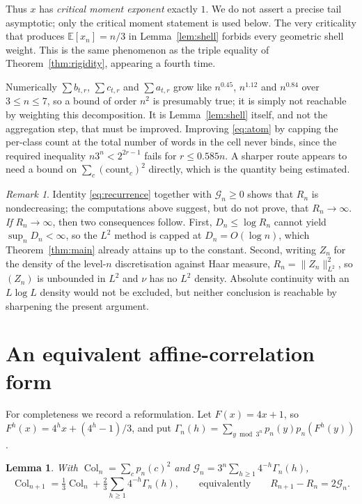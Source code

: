 \documentclass[11pt,reqno]{amsart}
\theoremstyle{plain}
\newtheorem{lemma}[theorem]{Lemma}
\theoremstyle{definition}
\theoremstyle{remark}
\newtheorem{remark}[theorem]{Remark}
\newcommand{\Col}{\operatorname{Col}}
\newcommand{\E}{\mathbb{E}}
\begin{document}
Thus $x$ has \emph{critical moment exponent} exactly $1$. We do not assert
a precise tail asymptotic; only the critical moment statement is used
below. The very criticality that produces $\E[x_n]=n/3$ in
Lemma~\ref{lem:shell} forbids every geometric shell weight. This is the
same phenomenon as the triple equality of Theorem~\ref{thm:rigidity},
appearing a fourth time.

Numerically $\sum b_{t,r}$, $\sum c_{t,r}$ and $\sum a_{t,r}$ grow like
$n^{0.45}$, $n^{1.12}$ and $n^{0.84}$ over $3\le n\le7$, so a bound of
order $n^{2}$ is presumably true; it is simply not reachable by weighting
this decomposition. It is Lemma~\ref{lem:shell} itself, and not the
aggregation step, that must be improved. Improving
\eqref{eq:atom} by capping the per-class count at the total number of words
in the cell never binds, since the required inequality $n3^n<2^{2r-1}$ fails
for $r\le0.585n$. A sharper route appears to need a bound on
$\sum_c(\text{count}_c)^2$ directly, which is the quantity being estimated.

\begin{remark}\label{rem:cap}
Identity \eqref{eq:recurrence} together with $\mathcal G_n\ge0$ shows that
$R_n$ is nondecreasing; the computations above suggest, but do not prove,
that $R_n\to\infty$. \emph{If} $R_n\to\infty$, then two consequences
follow. First, $D_n\le\log R_n$ cannot yield $\sup_nD_n<\infty$, so the
$L^2$ method is capped at $D_n=O(\log n)$, which Theorem~\ref{thm:main}
already attains up to the constant. Second, writing $Z_n$ for the density
of the level-$n$ discretisation against Haar measure, $R_n=\|Z_n\|_{L^2}^2$,
so $(Z_n)$ is unbounded in $L^2$ and $\nu$ has no $L^2$ density. Absolute
continuity with an $L\log L$ density would not be excluded, but neither
conclusion is reachable by sharpening the present argument.
\end{remark}

\section{An equivalent affine-correlation form}\label{sec:corollary}

For completeness we record a reformulation. Let $F(x)=4x+1$, so
$F^h(x)=4^hx+(4^h-1)/3$, and put
$\Gamma_n(h)=\sum_{y\bmod3^n}p_n(y)p_n(F^h(y))$.

\begin{lemma}\label{lem:recurrence}
With $\Col_n=\sum_cp_n(c)^2$ and
$\mathcal G_n=3^n\sum_{h\ge1}4^{-h}\Gamma_n(h)$,
\begin{equation}
\Col_{n+1}=\tfrac13\Col_n+\tfrac23\sum_{h\ge1}4^{-h}\Gamma_n(h),
\qquad\text{equivalently}\qquad
R_{n+1}-R_n=2\mathcal G_n .
\label{eq:recurrence}
\end{equation}
\end{lemma}
\end{document}
